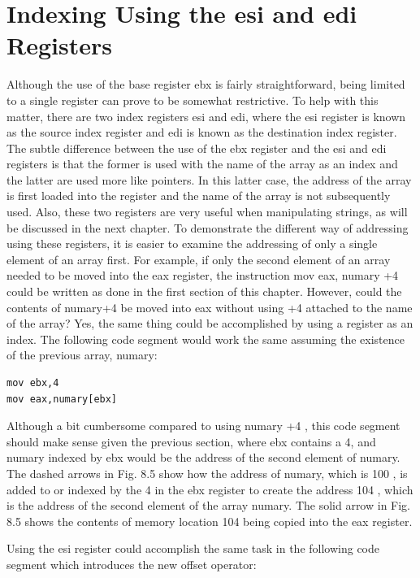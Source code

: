 \documentclass[10pt]{book}
\begin{document}
\section{Indexing Using the esi and edi Registers}
Although the use of the base register ebx is fairly straightforward, being limited to a single register can prove to be somewhat restrictive. To help with this matter, there are two index registers esi and edi, where the esi register is known as the source index register and edi is known as the destination index register. The subtle difference between the use of the ebx register and the esi and edi registers is that the former is used with the name of the array as an index and the latter are used more like pointers. In this latter case, the address of the array is first loaded into the register and the name of the array is not subsequently used. Also, these two registers are very useful when manipulating strings, as will be discussed in the next chapter.
To demonstrate the different way of addressing using these registers, it is easier to examine the addressing of only a single element of an array first. For example, if only the second element of an array needed to be moved into the eax register, the instruction mov eax, numary +4 could be written as done in the first section of this chapter. However, could the contents of numary+4 be moved into eax without using +4 attached to the name of the array? Yes, the same thing could be accomplished by using a register as an index. The following code segment would work the same assuming the existence of the previous array, numary:

\begin{verbatim}
mov ebx,4
mov eax,numary[ebx]
\end{verbatim}

Although a bit cumbersome compared to using numary +4 , this code segment should make sense given the previous section, where ebx contains a 4, and numary indexed by ebx would be the address of the second element of numary. The dashed arrows in Fig. 8.5 show how the address of numary, which is 100 , is added to or indexed by the 4 in the ebx register to create the address 104 , which is the address of the second element of the array numary. The solid arrow in Fig. 8.5 shows the contents of memory location 104 being copied into the eax register.

Using the esi register could accomplish the same task in the following code segment which introduces the new offset operator:
\end{document}
